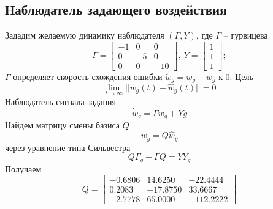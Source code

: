 \documentclass[a4paper, 12pt]{article}
\begin{document}
    \subsection{Наблюдатель задающего воздействия}
    Зададим желаемую динамику наблюдателя $\left( \Gamma,Y \right)$, где $\Gamma$ -- гурвицева
    $$
    \Gamma=\begin{bmatrix}
        -1 &0 &0\\
        0 &-5 &0\\
        0 &0 &-10
    \end{bmatrix},\ Y=\begin{bmatrix}
        1\\1\\1
    \end{bmatrix};
    $$
    $\Gamma$ определяет скорость схождения ошибки $\tilde{w}_g=w_g-\hat{w}_g$ к 0. Цель
    $$
    \lim\limits_{t\to\infty}||w_g(t)-\hat{w}_g(t)||=0
    $$
    Наблюдатель сигнала задания
    $$
    \dot{\bar{w}}_g=\Gamma\bar{w}_g+Yg
    $$
    Найдем матрицу смены базиса $Q$
    $$
    \bar{w}_g=Q\hat{w}_g
    $$
    через уравнение типа Сильвестра
    $$
    Q\Gamma_g-\Gamma Q=YY_g
    $$
    Получаем
    $$
    Q=\begin{bmatrix}
        -0.6806   &14.6250  &-22.4444\\
        0.2083  &-17.8750   &33.6667\\
       -2.7778   &65.0000 &-112.2222
    \end{bmatrix}
    $$
\end{document}
